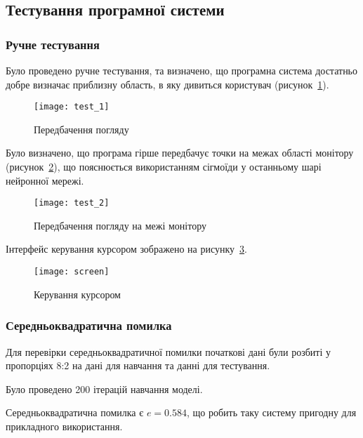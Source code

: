 \subsection{Тестування програмної системи}
\subsubsection{Ручне тестування}
Було проведено ручне тестування, та визначено, що програмна система достатньо добре визначає приблизну область, в яку дивиться користувач (рисунок~\ref{fig:test_1}).

\begin{figure}[H]
	\centering
	\texttt{[image: test\_1]}
	\caption{Передбачення погляду}
	\label{fig:test_1}
\end{figure} 

Було визначено, що програма гірше передбачує точки на межах області монітору (рисунок~\ref{fig:test_2}), що пояснюється використанням сігмоїди у останньому шарі нейронної мережі.

\begin{figure}[H]
	\centering
	\texttt{[image: test\_2]}
	\caption{Передбачення погляду на межі монітору}
	\label{fig:test_2}
\end{figure} 

Інтерфейс керування курсором зображено на рисунку~\ref{fig:cursor}.

\begin{figure}[H]
	\centering
	\texttt{[image: screen]}
	\caption{Керування курсором}
	\label{fig:cursor}
\end{figure} 

\subsubsection{Середньоквадратична помилка}
Для перевірки середньоквадратичної помилки початкові дані були розбиті у пропорціях 8:2 на дані для навчання та данні для тестування.

Було проведено 200 ітерацій навчання моделі.

Середньоквадратична помилка є $e = 0.584$, що робить таку систему пригодну для прикладного використання.

